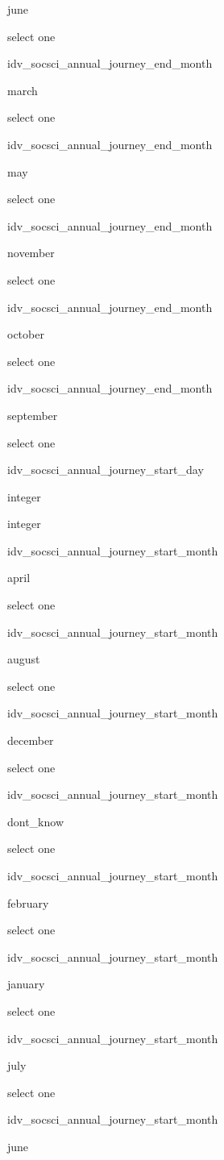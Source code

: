 \documentclass[]{article}
\begin{document}
june

select one

idv\_socsci\_annual\_journey\_end\_month

march

select one

idv\_socsci\_annual\_journey\_end\_month

may

select one

idv\_socsci\_annual\_journey\_end\_month

november

select one

idv\_socsci\_annual\_journey\_end\_month

october

select one

idv\_socsci\_annual\_journey\_end\_month

september

select one

idv\_socsci\_annual\_journey\_start\_day

integer

integer

idv\_socsci\_annual\_journey\_start\_month

april

select one

idv\_socsci\_annual\_journey\_start\_month

august

select one

idv\_socsci\_annual\_journey\_start\_month

december

select one

idv\_socsci\_annual\_journey\_start\_month

dont\_know

select one

idv\_socsci\_annual\_journey\_start\_month

february

select one

idv\_socsci\_annual\_journey\_start\_month

january

select one

idv\_socsci\_annual\_journey\_start\_month

july

select one

idv\_socsci\_annual\_journey\_start\_month

june
\end{document}
